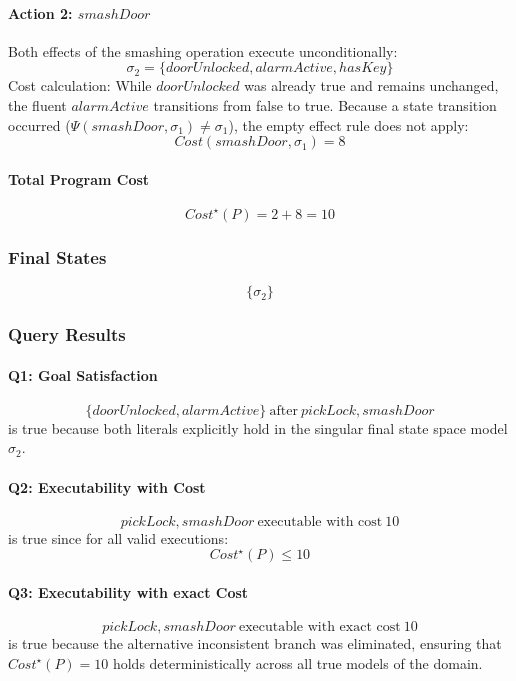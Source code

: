\documentclass[11pt]{article}
\begin{document}
\paragraph{Action 2: $smashDoor$}
Both effects of the smashing operation execute unconditionally:
\[
\sigma_2 = \{doorUnlocked, alarmActive, hasKey\}
\]
Cost calculation: While $doorUnlocked$ was already true and remains unchanged, the fluent $alarmActive$ transitions from false to true. Because a state transition occurred ($\Psi(smashDoor, \sigma_1) \neq \sigma_1$), the empty effect rule does not apply:
\[
Cost(smashDoor, \sigma_1) = 8
\]

\paragraph{Total Program Cost}
\[
Cost^\star(P) = 2 + 8 = 10
\]

\subsubsection*{Final States}
\[
\{\sigma_2\}
\]

\subsubsection*{Query Results}

\paragraph{Q1: Goal Satisfaction}
\[
\{doorUnlocked, alarmActive\} ~\text{after}~ pickLock, smashDoor
\]
is true because both literals explicitly hold in the singular final state space model $\sigma_2$.

\paragraph{Q2: Executability with Cost}
\[
pickLock, smashDoor ~\text{executable with cost}~ 10
\]
is true since for all valid executions:
\[
Cost^\star(P) \leq 10
\]

\paragraph{Q3: Executability with exact Cost}
\[
pickLock, smashDoor ~\text{executable with exact cost}~ 10
\]
is true because the alternative inconsistent branch was eliminated, ensuring that $Cost^\star(P) = 10$ holds deterministically across all true models of the domain.
\end{document}
